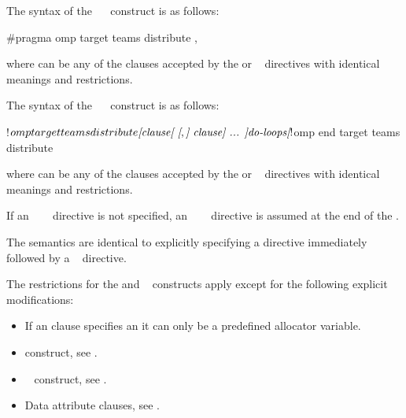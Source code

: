 \syntax
\begin{ccppspecific}
The syntax of the ~~ construct is as follows:

\begin{ompcPragma}
#pragma omp target teams distribute \plc{[clause[ [},\plc{] clause] ... ] new-line}
\end{ompcPragma}

where  can be any of the clauses accepted by the  or ~ directives
with identical meanings and restrictions.
\end{ccppspecific}

\begin{fortranspecific}
The syntax of the ~~ construct is as follows:

\begin{ompfPragma}
!$omp target teams distribute \plc{[clause[ [},\plc{] clause] ... ]}
    \plc{do-loops}
\plc{[}!$omp end target teams distribute\plc{]}
\end{ompfPragma}

where  can be any of the clauses accepted by the  or ~ directives
with identical meanings and restrictions.

If an ~~~ directive is not specified, an
~~~ directive is assumed at the end of the .
\end{fortranspecific}

\descr
The semantics are identical to explicitly specifying a  directive immediately
followed by a ~ directive.

\restrictions
The restrictions for the  and ~ constructs apply except for the following explicit modifications:

\begin{itemize}

\item If an  clause specifies an  it can only be a predefined allocator variable.

\end{itemize}

\crossreferences
\begin{itemize}
\item {} construct, see
.

\item {}~ construct, see
.

\item Data attribute clauses, see
.
\end{itemize}










